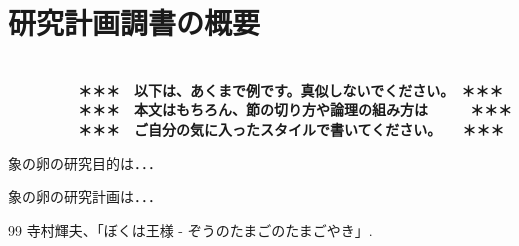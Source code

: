 \documentclass[11pt,a4j,dvipdfmx]{jarticle} 					%
\newcommand{\研究課題名}{象の卵}
\newcommand{\研究機関名}{逢坂大学}
\newcommand{\研究代表者氏名}{湯川秀樹}
\begin{document}

\section{研究計画調書の概要}

\JSPSInstructions	%

\textbf{\\　　　　　＊＊＊　以下は、あくまで例です。真似しないでください。　＊＊＊\\
　　　　　＊＊＊　本文はもちろん、節の切り方や論理の組み方は　　　＊＊＊\\
　　　　　＊＊＊　ご自分の気に入ったスタイルで書いてください。　　＊＊＊}

	 象の卵の研究目的は．．．

	象の卵の研究計画は．．．

		

	\vspace{1cm}
	\begin{thebibliography}{99}
		 寺村輝夫、「ぼくは王様 - ぞうのたまごのたまごやき」.
	\end{thebibliography}



\end{document}
